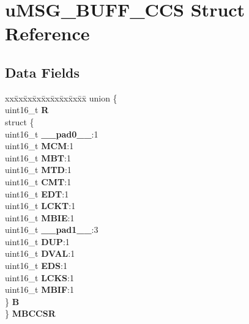 \hypertarget{structuMSG__BUFF__CCS}{}\section{u\+M\+S\+G\+\_\+\+B\+U\+F\+F\+\_\+\+C\+CS Struct Reference}
\label{structuMSG__BUFF__CCS}
\subsection*{Data Fields}
\begin{DoxyCompactItemize}
\item 
\mbox{\label{structuMSG__BUFF__CCS_aa4dab2f56826882baf7ed545ded179dc}} 
\begin{tabbing}
xx\=xx\=xx\=xx\=xx\=xx\=xx\=xx\=xx\=\kill
union \{\\
\>uint16\_t {\bfseries R}\\
\>struct \{\\
\>\>uint16\_t {\bfseries \_\_pad0\_\_}:1\\
\>\>uint16\_t {\bfseries MCM}:1\\
\>\>uint16\_t {\bfseries MBT}:1\\
\>\>uint16\_t {\bfseries MTD}:1\\
\>\>uint16\_t {\bfseries CMT}:1\\
\>\>uint16\_t {\bfseries EDT}:1\\
\>\>uint16\_t {\bfseries LCKT}:1\\
\>\>uint16\_t {\bfseries MBIE}:1\\
\>\>uint16\_t {\bfseries \_\_pad1\_\_}:3\\
\>\>uint16\_t {\bfseries DUP}:1\\
\>\>uint16\_t {\bfseries DVAL}:1\\
\>\>uint16\_t {\bfseries EDS}:1\\
\>\>uint16\_t {\bfseries LCKS}:1\\
\>\>uint16\_t {\bfseries MBIF}:1\\
\>\} {\bfseries B}\\
\} {\bfseries MBCCSR}\\


\end{tabbing}
\end{DoxyCompactItemize}
